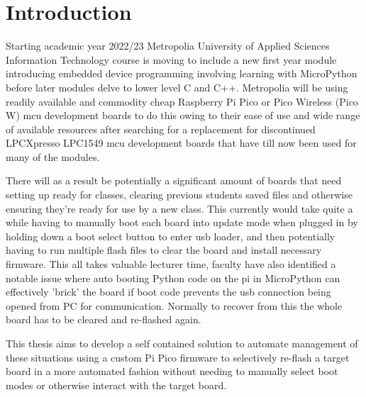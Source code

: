 
\chapter{Introduction}

Starting academic year 2022/23 Metropolia University of Applied Sciences Information Technology course is moving to include a new first year module introducing embedded device programming involving learning with MicroPython before later modules delve to lower level C and C++. Metropolia will be using readily available and commodity cheap Raspberry Pi Pico or Pico Wireless (Pico W) \gls{mcu} development boards to do this owing to their ease of use and wide range of available resources after searching for a replacement for discontinued LPCXpresso LPC1549 \gls{mcu} development boards that have till now been used for many of the modules.

There will as a result be potentially a significant amount of boards that need setting up ready for classes, clearing previous students saved files and otherwise ensuring they're ready for use by a new class. This currently would take quite a while having to manually boot each board into update mode when plugged in by holding down a boot select button to enter \gls{usb} loader, and then potentially having to run multiple flash files to clear the board and install necessary firmware. This all takes valuable lecturer time, faculty have also identified a notable issue where auto booting Python code on the pi in MicroPython can effectively 'brick' the board if boot code prevents the \gls{usb} connection being opened from PC for communication. Normally to recover from this the whole board has to be cleared and re-flashed again.

This thesis aims to develop a self contained solution to automate management of these situations using a custom Pi Pico firmware to selectively re-flash a target board in a more automated fashion without needing to manually select boot modes or otherwise interact with the target board.